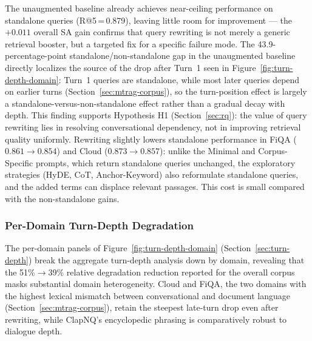 The unaugmented baseline already achieves near-ceiling performance on standalone queries
(R@5\,=\,0.879), leaving little room for improvement — the $+0.011$ overall SA gain confirms that
query rewriting is not merely a generic retrieval booster, but a targeted fix for a specific failure
mode. The 43.9-percentage-point standalone/non-standalone gap in the unaugmented baseline directly
localizes the source of the drop after Turn~1 seen in Figure~\ref{fig:turn-depth-domain}: Turn~1
queries are standalone, while most later queries depend on earlier turns
(Section~\ref{sec:mtrag-corpus}), so the turn-position effect is largely a standalone-versus-non-standalone
effect rather than a gradual decay with depth. This finding supports Hypothesis H1
(Section~\ref{sec:rq}): the value of query rewriting lies in resolving conversational dependency,
not in improving retrieval quality uniformly. Rewriting slightly lowers standalone performance in
FiQA ($0.861 \rightarrow 0.854$) and Cloud ($0.873 \rightarrow 0.857$): unlike the Minimal and
Corpus-Specific prompts, which return standalone queries unchanged, the exploratory strategies
(HyDE, CoT, Anchor-Keyword) also reformulate standalone queries, and the added terms can displace
relevant passages. This cost is small compared with the non-standalone gains.

\subsubsection{Per-Domain Turn-Depth Degradation}
\label{sec:turn-depth-domain}

The per-domain panels of Figure~\ref{fig:turn-depth-domain} (Section~\ref{sec:turn-depth}) break the aggregate
turn-depth analysis down by domain, revealing that the 51\%$\to$39\% relative
degradation reduction reported for the overall corpus masks substantial domain heterogeneity. Cloud
and FiQA, the two domains with the highest lexical mismatch between conversational and document
language (Section~\ref{sec:mtrag-corpus}), retain the steepest late-turn drop even after
rewriting, while ClapNQ's encyclopedic phrasing is comparatively robust to dialogue depth.



